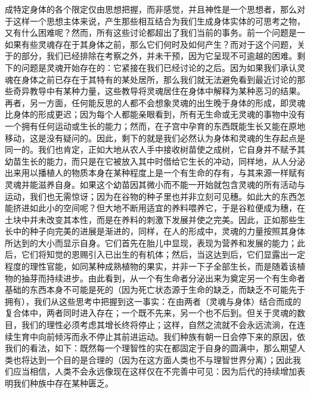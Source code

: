 成特定身体的各个限定仅由思想把握，而非感觉，并且神性是一个思想者，那么对于这样一个思想主体来说，产生那些相互结合为我们生成身体实体的可思考之物，又有什么困难呢？\newline{}然而，所有这些讨论都超出了我们当前的事务。前一个问题是一如果有些灵魂存在于其身体之前，那么它们何时及如何产生？而对于这个问题，关于的部分，我们已经排除在考察之外，并未干预，因为它呈现不可逾越的困难。剩下的问题是灵魂开始存在的：它紧接在我们已经讨论的之后。因为如果我们承认灵魂在身体之前已存在于其特有的某处居所，那么我们就无法避免看到最近讨论的那些奇异教导中有某种力量，这些教导将灵魂居住在身体中解释为某种恶习的结果。\newline{}再者，另一方面，任何能反思的人都不会想象灵魂的出生晚于身体的形成，即灵魂比身体的形成更迟；因为每个人都能亲眼看到，所有无生命或无灵魂的事物中没有一个拥有任何运动或生长的能力；然而，在子宫中孕育的东西既能生长又能在原地移动，这是没有疑问的。因此，剩下的就是我们必然认为身体和灵魂的生存起点是同一的。\newline{}我们也肯定，正如大地从农人手中接收树苗使之成树，它自身并不赋予其幼苗生长的能力，而只是在它被放入其中时借给它生长的冲动，同样地，从人分泌出来用以播植人的物质本身在某种程度上是一个有生命的存有，与其来源一样赋有灵魂并能滋养自身。\newline{}如果这个幼苗因其微小而不能一开始就包含灵魂的所有活动与运动，我们也无需惊讶；因为在谷物的种子里也并非立刻可见穗。如此大的东西怎能挤进如此小的空间呢？\newline{}但大地不断用适宜的养料喂养它，于是谷粒便成为穗，在土块中并未改变其本性，而是在养料的刺激下发展并使之完美。\newline{}因此，正如那些生长中的种子向完美的进展是渐进的，同样，在人的形成中，灵魂的力量按照其身体所达到的大小而显示自身。它们首先在胎儿中显现，表现为营养和发展的能力；此后，它们将知觉的恩赐引入已出生的有机体；然后，当这达到后，它们显露出一定程度的理性官能，如同某种成熟植物的果实，并非一下子全部生长，而是随着该植物的抽芽而持续进步。\newline{}由此看到，从一个有生命者分泌出来为奠定另一个有生命者基础的东西本身不可能是死的（因为死亡状态源于生命的缺乏，而缺乏不可能先于拥有），我们从这些思考中把握到这一事实：在由两者（灵魂与身体）结合而成的复合体中，两者同时进入存在；一个既不先来，另一个也不后到。\newline{}但关于灵魂的数目，我们的理性必须考虑其增长终将停止；这样，自然之流就不会永远流淌，在连续生育中向前倾泻而永不停止其前进运动。我们种族有朝一日会停下来的原因，依我们的看法，如下：既然每一个理智性的实在都固定于自身的圆满中，那么期望人类也将达到一个目的是合理的（因为在这方面人类也不与理智世界分离）；因此我们应当相信，人类不会永远像现在这样仅在不完善中可见：因为后代的持续增加表明我们种族中存在某种匮乏。\par

